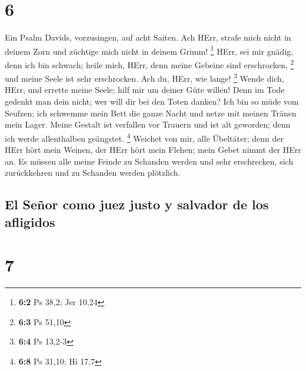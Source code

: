 \hypertarget{section-5}{%
\section{6}\label{section-5}}

 Ein Psalm Davids, vorzusingen, auf acht Saiten.
 Ach HErr, strafe mich nicht in deinem Zorn und züchtige
mich nicht in deinem Grimm! \footnote{\textbf{6:2} Ps 38,2; Jer 10,24}
 HErr, sei mir gnädig, denn ich bin schwach; heile mich,
HErr, denn meine Gebeine sind erschrocken, \footnote{\textbf{6:3} Ps
  51,10}  und meine Seele ist sehr erschrocken. Ach du,
HErr, wie lange! \footnote{\textbf{6:4} Ps 13,2-3}  Wende
dich, HErr, und errette meine Seele; hilf mir um deiner Güte willen!
 Denn im Tode gedenkt man dein nicht; wer will dir bei den
Toten danken?  Ich bin so müde vom Seufzen; ich schwemme
mein Bett die ganze Nacht und netze mit meinen Tränen mein Lager.
 Meine Gestalt ist verfallen vor Trauern und ist alt
geworden; denn ich werde allenthalben geängstet. \footnote{\textbf{6:8}
  Ps 31,10; Hi 17,7}  Weichet von mir, alle Übeltäter;
denn der HErr hört mein Weinen,  der HErr hört mein
Flehen; mein Gebet nimmt der HErr an.  Es müssen alle
meine Feinde zu Schanden werden und sehr erschrecken, sich zurückkehren
und zu Schanden werden plötzlich.

\hypertarget{el-seuxf1or-como-juez-justo-y-salvador-de-los-afligidos}{%
\subsection{El Señor como juez justo y salvador de los
afligidos}\label{el-seuxf1or-como-juez-justo-y-salvador-de-los-afligidos}}

\hypertarget{section-6}{%
\section{7}\label{section-6}}


